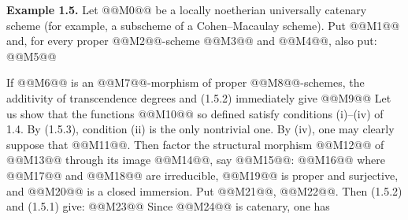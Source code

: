 
\textbf{Example 1.5.} Let @@M0@@ be a locally noetherian universally catenary scheme (for example, a subscheme of a Cohen--Macaulay scheme). Put
@@M1@@
and, for every proper @@M2@@-scheme @@M3@@ and @@M4@@, also put:
@@M5@@

If @@M6@@ is an @@M7@@-morphism of proper @@M8@@-schemes, the additivity of transcendence degrees and (1.5.2) immediately give
@@M9@@
Let us show that the functions @@M10@@ so defined satisfy conditions (i)--(iv) of 1.4. By (1.5.3), condition (ii) is the only nontrivial one. By (iv), one may clearly suppose that @@M11@@. Then factor the structural morphism @@M12@@ of @@M13@@ through its image @@M14@@, say @@M15@@:
@@M16@@
where @@M17@@ and @@M18@@ are irreducible, @@M19@@ is proper and surjective, and @@M20@@ is a closed immersion. Put @@M21@@, @@M22@@. Then (1.5.2) and (1.5.1) give:
@@M23@@
Since @@M24@@ is catenary, one has

